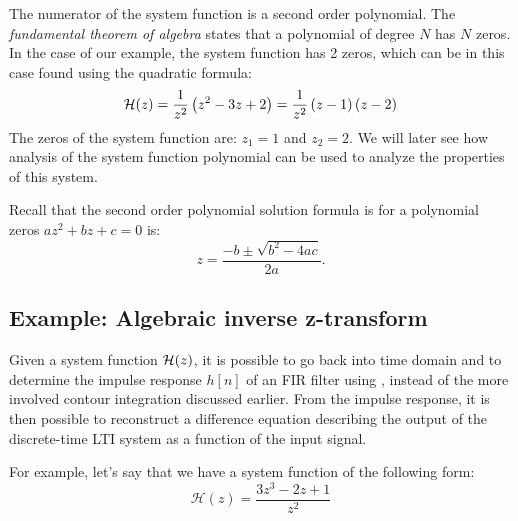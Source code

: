 The numerator of the system function is a second order polynomial. The \emph{fundamental theorem of algebra} states that a polynomial of degree $N$ has $N$ zeros. In the case of our example, the system function has 2 zeros, which can be in this case found using the quadratic formula:
\begin{equation}
\mathcal{H}(z) = \frac{1}{z^2}\left(z^2 -3z + 2 \right) = \frac{1}{z^2}\left(z-1\right)\left(z-2\right)
\end{equation}
The zeros of the system function are: $z_1=1$ and $z_2=2$. We will later see how analysis of the system function polynomial can be used to analyze the properties of this system. 

Recall that the second order polynomial solution formula is for a polynomial zeros $a z^2 + bz + c=0$ is:
\begin{equation}
z = \frac{-b \pm \sqrt{b^2-4ac}}{2a}.
\end{equation}

\fi
\subsection{Example: Algebraic inverse z-transform}

Given a system function $\mathcal{H}(z)$, it is possible to go back into time
domain and to determine the impulse response $h[n]$ of an FIR filter
using , instead of the more involved contour integration
discussed earlier. From the impulse response, it is then possible to
reconstruct a difference equation describing the output of the
discrete-time LTI system as a function of the input signal.

For example, let's say that we have a system function of the following form:
\begin{equation}
  \mathcal{H}(z) = \frac{3z^{3} - 2 z + 1}{z^{2}}
  \label{eq:poly_ex}
\end{equation}


